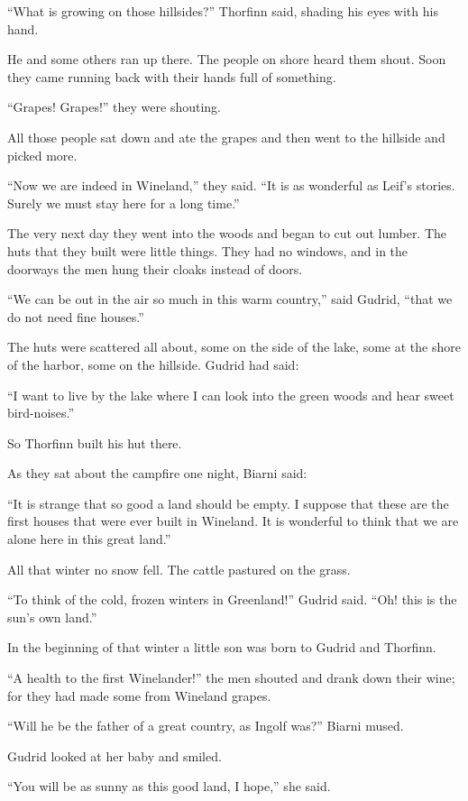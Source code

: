 ``What is growing on those hillsides?'' Thorfinn said, shading his eyes
with his hand.

He and some others ran up there. The people on shore heard them shout.
Soon they came running back with their hands full of something.

``Grapes! Grapes!'' they were shouting.

All those people sat down and ate the grapes and then went to the
hillside and picked more.

``Now we are indeed in Wineland,'' they said. ``It is as wonderful as
Leif's stories. Surely we must stay here for a long time.''

The very next day they went into the woods and began to cut out lumber.
The huts that they built were little things. They had no windows, and in
the doorways the men hung their cloaks instead of doors.

``We can be out in the air so much in this warm country,'' said Gudrid,
``that we do not need fine houses.''

The huts were scattered all about, some on the side of the lake, some at
the shore of the harbor, some on the hillside. Gudrid had said:

``I want to live by the lake where I can look into the green woods and
hear sweet bird-noises.''

So Thorfinn built his hut there.

As they sat about the campfire one night, Biarni said:

``It is strange that so good a land should be empty. I suppose that
these are the first houses that were ever built in Wineland. It is
wonderful to think that we are alone here in this great land.''

All that winter no snow fell. The cattle pastured on the grass.

``To think of the cold, frozen winters in Greenland!'' Gudrid said.
``Oh! this is the sun's own land.''

In the beginning of that winter a little son was born to Gudrid and
Thorfinn.

``A health to the first Winelander!'' the men shouted and drank down
their wine; for they had made some from Wineland grapes.

``Will he be the father of a great country, as Ingolf was?'' Biarni
mused.

Gudrid looked at her baby and smiled.

``You will be as sunny as this good land, I hope,'' she said.

